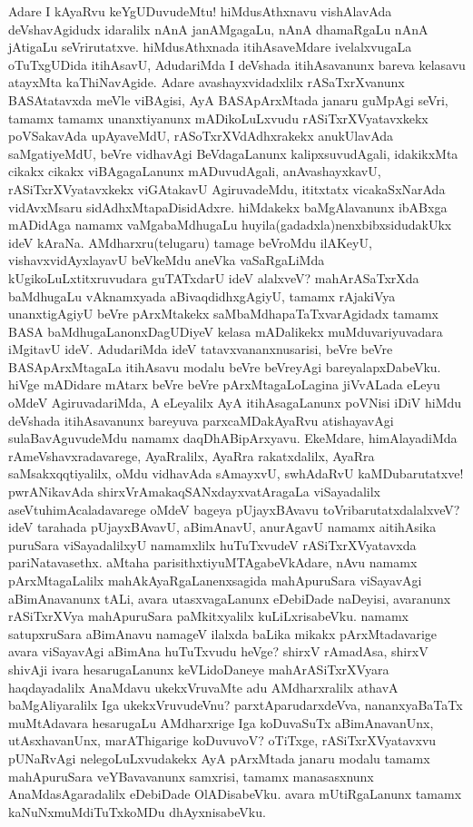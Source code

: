 \documentclass[11pt,a4size]{article}
\begin{document}
Adare I kAyaRvu keYgUDuvudeMtu! hiMdusAthxnavu vishAlavAda
deVshavAgidudx idaralilx nAnA janAMgagaLu, nAnA dhamaRgaLu nAnA
jAtigaLu seVrirutatxve. hiMdusAthxnada itihAsaveMdare ivelalxvugaLa
oTuTxgUDida itihAsavU, AdudariMda I deVshada itihAsavanunx bareva
kelasavu atayxMta kaThiNavAgide. Adare avashayxvidadxlilx
rASaTxrXvanunx BASAtatavxda meVle viBAgisi, AyA BASApArxMtada janaru
guMpAgi seVri, tamamx tamamx unanxtiyanunx mADikoLuLxvudu
rASiTxrXVyatavxkekx poVSakavAda upAyaveMdU, rASoTxrXVdAdhxrakekx
anukUlavAda saMgatiyeMdU, beVre vidhavAgi BeVdagaLanunx
kalipxsuvudAgali, idakikxMta cikakx cikakx viBAgagaLanunx
mADuvudAgali, anAvashayxkavU, rASiTxrXVyatavxkekx viGAtakavU
AgiruvadeMdu, ititxtatx vicakaSxNarAda vidAvxMsaru
sidAdhxMtapaDisidAdxre. hiMdakekx baMgAlavanunx ibABxga mADidAga
namamx vaMgabaMdhugaLu huyila(gadadxla)nenxbibxsidudakUkx ideV
kAraNa. AMdharxru(telugaru) tamage beVroMdu ilAKeyU,
vishavxvidAyxlayavU beVkeMdu aneVka vaSaRgaLiMda
kUgikoLuLxtitxruvudara guTATxdarU ideV alalxveV? mahArASaTxrXda
baMdhugaLu vAknamxyada aBivaqdidhxgAgiyU, tamamx rAjakiVya
unanxtigAgiyU beVre pArxMtakekx saMbaMdhapaTaTxvarAgidadx tamamx BASA
baMdhugaLanonxDagUDiyeV kelasa mADalikekx muMduvariyuvadara iMgitavU
ideV. AdudariMda ideV tatavxvananxnusarisi, beVre beVre
BASApArxMtagaLa itihAsavu modalu beVre beVreyAgi
bareyalapxDabeVku. hiVge mADidare mAtarx beVre beVre pArxMtagaLoLagina
jiVvALada eLeyu oMdeV AgiruvadariMda, A eLeyalilx AyA itihAsagaLanunx
poVNisi iDiV hiMdu deVshada itihAsavanunx bareyuva parxcaMDakAyaRvu
atishayavAgi sulaBavAguvudeMdu namamx daqDhABipArxyavu. EkeMdare,
himAlayadiMda rAmeVshavxradavarege, AyaRralilx, AyaRra rakatxdalilx,
AyaRra saMsakxqqtiyalilx, oMdu vidhavAda sAmayxvU, swhAdaRvU
kaMDubarutatxve! pwrANikavAda shirxVrAmakaqSANxdayxvatAragaLa
viSayadalilx aseVtuhimAcaladavarege oMdeV bageya pUjayxBAvavu
toVribarutatxdalalxveV? ideV tarahada pUjayxBAvavU, aBimAnavU,
anurAgavU namamx aitihAsika puruSara viSayadalilxyU namamxlilx
huTuTxvudeV rASiTxrXVyatavxda pariNatavasethx. aMtaha
parisithxtiyuMTAgabeVkAdare, nAvu namamx pArxMtagaLalilx
mahAkAyaRgaLanenxsagida mahApuruSara viSayavAgi aBimAnavanunx tALi,
avara utasxvagaLanunx eDebiDade naDeyisi, avaranunx rASiTxrXVya
mahApuruSara paMkitxyalilx kuLiLxrisabeVku. namamx satupxruSara
aBimAnavu namageV ilalxda baLika mikakx pArxMtadavarige avara
viSayavAgi aBimAna huTuTxvudu heVge? shirxV rAmadAsa, shirxV shivAji
ivara hesarugaLanunx keVLidoDaneye mahArASiTxrXVyara haqdayadalilx
AnaMdavu ukekxVruvaMte adu AMdharxralilx athavA baMgAliyaralilx Iga
ukekxVruvudeVnu? parxtAparudarxdeVva, nananxyaBaTaTx muMtAdavara
hesarugaLu AMdharxrige Iga koDuvaSuTx aBimAnavanUnx, utAsxhavanUnx,
marAThigarige koDuvuvoV? oTiTxge, rASiTxrXVyatavxvu pUNaRvAgi
nelegoLuLxvudakekx AyA pArxMtada janaru modalu tamamx mahApuruSara
veYBavavanunx samxrisi, tamamx manasasxnunx AnaMdasAgaradalilx
eDebiDade OlADisabeVku. avara mUtiRgaLanunx tamamx
kaNuNxmuMdiTuTxkoMDu dhAyxnisabeVku.
\end{document}
